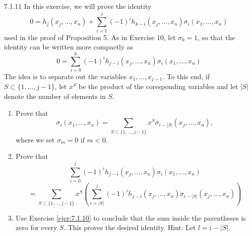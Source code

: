 \documentclass[twoside]{article}
\begin{document}
\begin{ejercicio}{7.1.11}
In this exercise, we will prove the identity
\[ 0 = h_j(x_j, \dots, x_n) + \sum_{i=1}^j (-1)^i h_{k-i}(x_j,\dots,x_n) σ_i(x_1,\dots,x_n) \]
used in the proof of Proposition 5.
As in Exercise 10, let $σ_0 = 1$, so that the identity can be written more compactly as
\[ 0 = \sum_{i=0}^k (-1)^i h_{j-i}(x_j,\dots,x_n) σ_i(x_1,\dots,x_n) \]
The idea is to separate out the variables $x_1,\dots,x_{j-1}$.
To this end, if $S \subset \{1,\dots,j-1\}$, let $x^S$ be the product of the coresponding variables and let $|S|$ denote the number of elements in $S$.
\begin{enumerate}
\item Prove that
\[ σ_i(x_1,\dots,x_n) = \sum_{S \subset \{1,\dots,j-1\}} x^S σ_{i-|S|}(x_j,\dots,x_n), \]
where we set $σ_m = 0$ if $m < 0$.
\item Prove that
\[ \sum_{i=0}^j (-1)^i h_{j-i}(x_j,\dots,x_n) σ_i(x_1,\dots,x_n) \]
\begin{equation}\label{eq:7.1.11} = \sum_{S \subset \{1,\dots,j-1\}} x^S \left(\sum_{i=|S|}^j (-1)^i h_{j-i}(x_j,\dots,x_n) σ_{i-|S|}(x_j,\dots,x_n)\right) \end{equation}
\item Use Exercise \ref{ejer:7.1.10} to conclude that the sum inside the parentheses is zero for every $S$.
This proves the desired identity.
Hint: Let $l = i-|S|$.
\end{enumerate}
\end{ejercicio}
\end{document}
